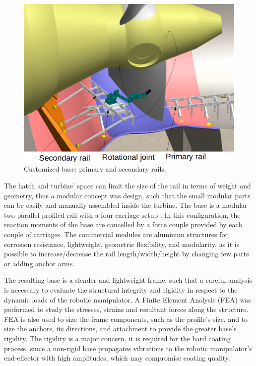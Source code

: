 \begin{figure}
	\centering
	\includegraphics[width=.9\columnwidth]{figs/mecanica/EMMA_Base_Secundaria_02.PNG}
    \caption{Customized base: primary and secondary rails.}
    \label{fig:base}
\end{figure}

The hatch and turbine' space can limit the size of the rail in terms of weight
and geometry, thus a modular concept was design, such that the small modular parts can be easily and
manually assembled inside the turbine. The base is a modular two parallel
profiled rail with a four carriage setup%
. In this
configuration, the reaction moments of the base are cancelled by a force couple provided by each couple of
carriages. The commercial modules are aluminum structures for corrosion resistance,
lightweight, geometric flexibility, and modularity, as it is possible to
increase/decrease the rail length/width/height by changing few parts or adding
anchor arms.

The resulting base is a slender and lightweight frame, such that a careful
analysis is necessary to evaluate the structural integrity and rigidity in
respect to the dynamic loads of the robotic manipulator. A Finite Element
Analysis (FEA) was performed to study the stresses, strains and resultant forces
along the structure. FEA is also used to size the frame components, such as
the profile's size, and to size the anchors, its directions, and attachment to
provide the greater base's rigidity. The rigidity is a major concern, it is
required for the hard coating process, since a non-rigid base propagates
vibrations to the robotic manipulator's end-effector with high amplitudes, which
may compromise coating quality.

